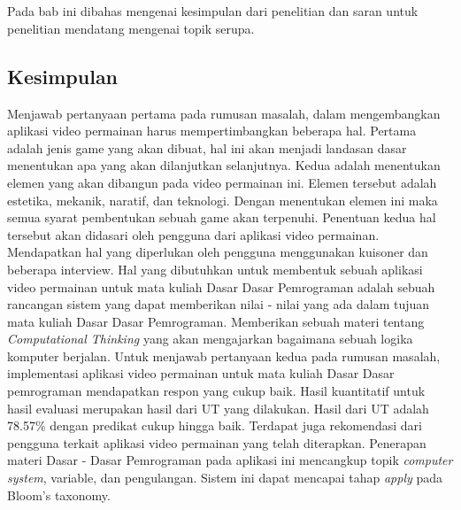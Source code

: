 \chapter{\babLima}
Pada bab ini dibahas mengenai kesimpulan dari penelitian dan saran untuk penelitian
mendatang mengenai topik serupa.
\section{Kesimpulan}
Menjawab pertanyaan pertama pada rumusan masalah, dalam mengembangkan aplikasi video permainan harus mempertimbangkan beberapa hal. Pertama adalah jenis game yang akan dibuat, hal ini akan menjadi landasan dasar menentukan apa yang akan dilanjutkan selanjutnya. Kedua adalah menentukan elemen yang akan dibangun pada video permainan ini. Elemen tersebut adalah estetika, mekanik, naratif, dan teknologi. Dengan menentukan elemen ini maka semua syarat pembentukan sebuah game akan terpenuhi. Penentuan kedua hal tersebut akan didasari oleh pengguna dari aplikasi video permainan. Mendapatkan hal yang diperlukan oleh pengguna menggunakan kuisoner dan beberapa interview. Hal yang dibutuhkan untuk membentuk sebuah aplikasi video permainan untuk mata kuliah Dasar Dasar Pemrograman adalah sebuah rancangan sistem yang dapat memberikan nilai - nilai yang ada dalam tujuan mata kuliah Dasar Dasar Pemrograman. Memberikan sebuah materi tentang \textit{Computational Thinking} yang akan mengajarkan bagaimana sebuah logika komputer berjalan.
\linebreak\linebreak
Untuk menjawab pertanyaan kedua pada rumusan masalah, implementasi aplikasi video permainan untuk mata kuliah Dasar Dasar pemrograman mendapatkan respon yang cukup baik. Hasil kuantitatif untuk hasil evaluasi merupakan hasil dari UT yang dilakukan. Hasil dari UT adalah 78.57\% dengan predikat cukup hingga baik. Terdapat juga rekomendasi dari pengguna terkait aplikasi video permainan yang telah diterapkan. Penerapan materi Dasar - Dasar Pemrograman pada aplikasi ini mencangkup topik \textit{computer system}, variable, dan pengulangan. Sistem ini dapat mencapai tahap \textit{apply} pada Bloom's taxonomy.

